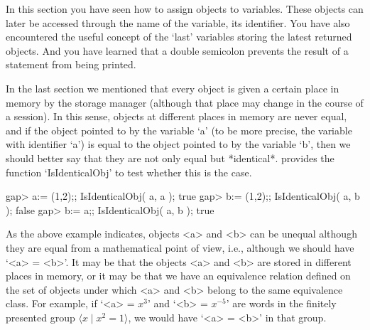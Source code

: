 In this section you  have seen how to  assign objects to variables. These
objects  can  later be accessed  through the  name  of the  variable, its
identifier. You  have also encountered the  useful concept of  the `last'
variables storing the latest returned  objects. And you have learned that
a double semicolon prevents the result of a statement from being printed.

\null

In the last section  we mentioned that every object   is given a  certain
place  in memory by the  {\GAP} storage manager  (although that place may
change in the course  of  a {\GAP}  session). In  this sense, objects  at
different places in memory are never equal, and if  the object pointed to
by the  variable  `a' (to be more  precise,  the variable with identifier
`a')  is  equal to the   object pointed to by  the  variable `b', then we
should better  say that they  are not only  equal but *identical*. {\GAP}
provides the function `IsIdenticalObj' to test whether this is the case.

\beginexample
gap> a:= (1,2);; IsIdenticalObj( a, a );
true
gap> b:= (1,2);; IsIdenticalObj( a, b );
false
gap> b:= a;; IsIdenticalObj( a, b );
true
\endexample


%

As the above example indicates, {\GAP}
objects  <a>  and  <b> can  be  unequal  although they are   equal from a
mathematical point of view, i.e., although we should have `<a> = <b>'. It
may  be that the objects <a>  and <b> are  stored  in different places in
memory, or it may be that we have  an equivalence relation defined on the
set of  objects under which <a>  and <b> belong   to the same equivalence
class.  For example, if `<a>  = $x^3$' and  `<b> = $x^{-5}$' are words in
the finitely presented group $\langle  x\mid x^2=1\rangle$, we would have
`<a> = <b>' in that group.

